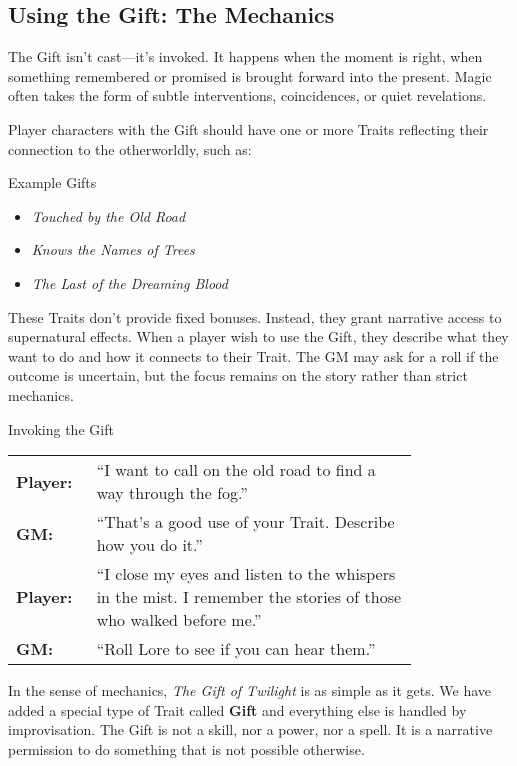 \subsection{Using the Gift: The Mechanics}

The Gift isn’t cast—it’s invoked. It happens when the moment is right, when something remembered or promised is brought forward into the present. Magic often takes the form of subtle interventions, coincidences, or quiet revelations.

Player characters with the Gift should have one or more Traits reflecting their connection to the otherworldly, such as:  
\begin{Example}{Example Gifts}
    \begin{itemize}
        \item \textit{Touched by the Old Road}  
        \item \textit{Knows the Names of Trees}  
        \item \textit{The Last of the Dreaming Blood}  
    \end{itemize}
\end{Example}

These Traits don’t provide fixed bonuses. Instead, they grant narrative access to supernatural effects. When a player wish to use the Gift, they describe what they want to do and how it connects to their Trait. The GM may ask for a roll if the outcome is uncertain, but the focus remains on the story rather than strict mechanics.

\begin{Example}{Invoking the Gift}
    \begin{tabular}{@{}l p{0.8\linewidth}@{}}
        \textbf{Player:} & “I want to call on the old road to find a way through the fog.”  \\
        \textbf{GM:} & “That’s a good use of your Trait. Describe how you do it.” \\
        \textbf{Player:} & “I close my eyes and listen to the whispers in the mist. I remember the stories of those who walked before me.”  \\
        \textbf{GM:} & “Roll Lore to see if you can hear them.”
    \end{tabular}    
\end{Example}

In the sense of mechanics, \emph{The Gift of Twilight} is as simple as it gets. We have added a special type of Trait called \textbf{Gift} and everything else is handled by improvisation. The Gift is not a skill, nor a power, nor a spell. It is a narrative permission to do something that is not possible otherwise.

